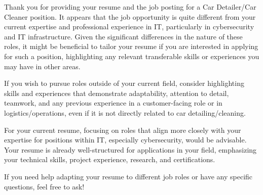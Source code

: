 Thank you for providing your resume and the job posting for a Car Detailer/Car Cleaner position. It appears that the job opportunity is quite different from your current expertise and professional experience in IT, particularly in cybersecurity and IT infrastructure. Given the significant differences in the nature of these roles, it might be beneficial to tailor your resume if you are interested in applying for such a position, highlighting any relevant transferable skills or experiences you may have in other areas.

If you wish to pursue roles outside of your current field, consider highlighting skills and experiences that demonstrate adaptability, attention to detail, teamwork, and any previous experience in a customer-facing role or in logistics/operations, even if it is not directly related to car detailing/cleaning.

For your current resume, focusing on roles that align more closely with your expertise for positions within IT, especially cybersecurity, would be advisable. Your resume is already well-structured for applications in your field, emphasizing your technical skills, project experience, research, and certifications.

If you need help adapting your resume to different job roles or have any specific questions, feel free to ask!